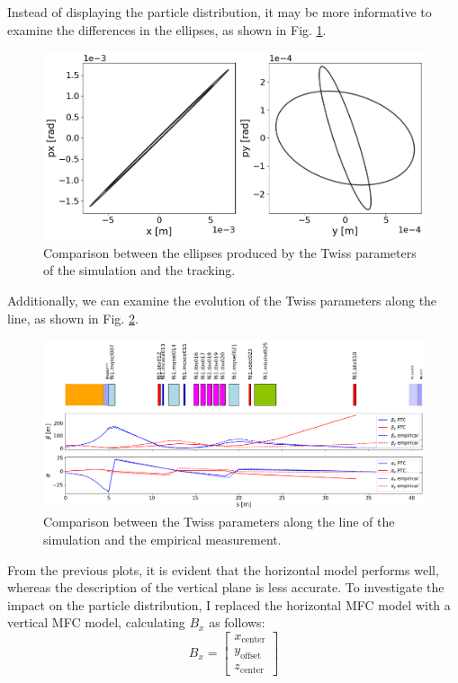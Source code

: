 Instead of displaying the particle distribution, it may be more informative to examine the differences in the ellipses, as shown in Fig. \ref{fig:ellipses}.

\begin{figure}[H]
\centering
\includegraphics[width=1.0\textwidth]{02_Simulation/images/ellipses.png}
\caption{Comparison between the ellipses produced by the Twiss parameters of the simulation and the tracking.}
\label{fig:ellipses}
\end{figure}

Additionally, we can examine the evolution of the Twiss parameters along the line, as shown in Fig. \ref{fig:twiss_params}.

\begin{figure}[H]
\centering
\includegraphics[width=1.0\textwidth]{02_Simulation/images/twiss_parameters_comparison.png}
\caption{Comparison between the Twiss parameters along the line of the simulation and the empirical measurement.}
\label{fig:twiss_params}
\end{figure}

From the previous plots, it is evident that the horizontal model performs well, whereas the description of the vertical plane is less accurate. To investigate the impact on the particle distribution, I replaced the horizontal MFC model with a vertical MFC model, calculating $B_{x}$ as follows:
\[
B_{x} = \begin{bmatrix}  
x_{\text{center}} \\  
y_{\text{offset}} \\
z_{\text{center}} 
\end{bmatrix}
\]

